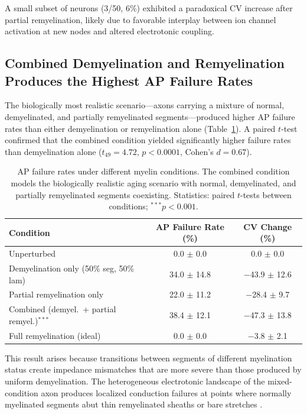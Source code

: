 \documentclass[11pt]{article}
\begin{document}
A small subset of neurons (3/50, 6\%) exhibited a paradoxical CV increase after partial remyelination, likely due to favorable interplay between ion channel activation at new nodes and altered electrotonic coupling.

\subsection{Combined Demyelination and Remyelination Produces the Highest AP Failure Rates}

The biologically most realistic scenario---axons carrying a mixture of normal, demyelinated, and partially remyelinated segments---produced higher AP failure rates than either demyelination or remyelination alone (Table~\ref{tab:combined}). A paired $t$-test confirmed that the combined condition yielded significantly higher failure rates than demyelination alone ($t_{49} = 4.72$, $p < 0.0001$, Cohen's $d = 0.67$).

\begin{table}[H]
\centering
\caption{AP failure rates under different myelin conditions. The combined condition models the biologically realistic aging scenario with normal, demyelinated, and partially remyelinated segments coexisting. Statistics: paired $t$-tests between conditions; $^{\ast\ast\ast}p<0.001$.}
\label{tab:combined}
\begin{tabular}{lcc}
\toprule
\textbf{Condition} & \textbf{AP Failure Rate (\%)} & \textbf{CV Change (\%)} \\
\midrule
Unperturbed & 0.0 $\pm$ 0.0 & 0.0 $\pm$ 0.0 \\
Demyelination only (50\% seg, 50\% lam) & 34.0 $\pm$ 14.8 & $-$43.9 $\pm$ 12.6 \\
Partial remyelination only & 22.0 $\pm$ 11.2 & $-$28.4 $\pm$ 9.7 \\
Combined (demyel.\ + partial remyel.)$^{\ast\ast\ast}$ & 38.4 $\pm$ 12.1 & $-$47.3 $\pm$ 13.8 \\
Full remyelination (ideal) & 0.0 $\pm$ 0.0 & $-$3.8 $\pm$ 2.1 \\
\bottomrule
\end{tabular}
\end{table}

This result arises because transitions between segments of different myelination status create impedance mismatches that are more severe than those produced by uniform demyelination. The heterogeneous electrotonic landscape of the mixed-condition axon produces localized conduction failures at points where normally myelinated segments abut thin remyelinated sheaths or bare stretches \citep{scurfield2018}.
\end{document}
